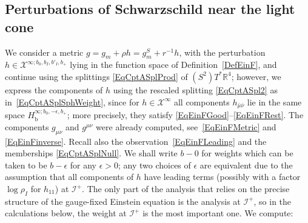\documentclass[reqno,11pt,letterpaper]{amsart}
\numberwithin{equation}{section}
\numberwithin{figure}{section}
\theoremstyle{definition}
\theoremstyle{remark}
\newcommand{\mc}{\mathcal}
\newcommand{\cX}{\mc X}
\newcommand{\ms}{\mathscr}
\newcommand{\scri}{\ms I}
\newcommand{\R}{\mathbb{R}}
\newcommand{\eps}{\epsilon}
\newcommand{\bop}{{\mathrm{b}}}
\newcommand{\Hb}{H_{\bop}}
\begin{document}
\subsection{Perturbations of Schwarzschild near the light cone}
\label{SsCoPert}

We consider a metric $g=g_m+\rho h=g_m^S+r^{-1} h$, with the perturbation $h\in\cX^{\infty;b_0,b_I,b'_I,b_+}$ lying in the function space of Definition~\ref{DefEinF}, and continue using the splittings \eqref{EqCptASplProd} of $(S^2)T^*\R^4$; however, we express the components of $h$ using the rescaled splitting \eqref{EqCptASpl2} as in~\eqref{EqCptASplSphWeight}, since for $h\in\cX^\infty$ all components $h_{\bar\mu\bar\nu}$ lie in the same space $\Hb^{\infty;b_0,-\eps,b_+}$; more precisely, they satisfy \eqref{EqEinFGood}--\eqref{EqEinFRest}. The components $g_{\mu\nu}$ and $g^{\mu\nu}$ were already computed, see~\eqref{EqEinFMetric} and \eqref{EqEinFinverse}. Recall also the observation~\eqref{EqEinFLeading} and the memberships \eqref{EqCptASplNull}. We shall write $b-0$ for weights which can be taken to be $b-\eps$ for any $\eps>0$; any two choices of $\eps$ are equivalent due to the assumption that all components of $h$ have leading terms (possibly with a factor $\log\rho_I$ for $h_{1 1}$) at $\scri^+$. The only part of the analysis that relies on the precise structure of the gauge-fixed Einstein equation is the analysis at $\scri^+$, so in the calculations below, the weight at $\scri^+$ is the most important one. We compute:
\end{document}
